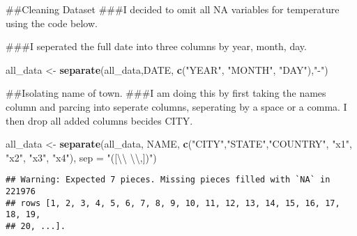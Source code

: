\documentclass[]{article}
\newenvironment{Shaded}{\begin{snugshade}}{\end{snugshade}}
\newcommand{\CharTok}[1]{\textcolor[rgb]{0.31,0.60,0.02}{#1}}
\newcommand{\CommentTok}[1]{\textcolor[rgb]{0.56,0.35,0.01}{\textit{#1}}}
\newcommand{\DataTypeTok}[1]{\textcolor[rgb]{0.13,0.29,0.53}{#1}}
\newcommand{\KeywordTok}[1]{\textcolor[rgb]{0.13,0.29,0.53}{\textbf{#1}}}
\newcommand{\NormalTok}[1]{#1}
\newcommand{\OperatorTok}[1]{\textcolor[rgb]{0.81,0.36,0.00}{\textbf{#1}}}
\newcommand{\StringTok}[1]{\textcolor[rgb]{0.31,0.60,0.02}{#1}}
\begin{document}
\#\#Cleaning Dataset \#\#\#I decided to omit all NA variables for
temperature using the code below.

\begin{Shaded}
\end{Shaded}

\#\#\#I seperated the full date into three columns by year, month, day.

\begin{Shaded}
\begin{Highlighting}[]
\NormalTok{all_data <-}\StringTok{ }\KeywordTok{separate}\NormalTok{(all_data,DATE, }\KeywordTok{c}\NormalTok{(}\StringTok{"YEAR"}\NormalTok{, }\StringTok{"MONTH"}\NormalTok{, }\StringTok{"DAY"}\NormalTok{),}\StringTok{"-"}\NormalTok{)}
\end{Highlighting}
\end{Shaded}

\#\#Isolating name of town. \#\#\#I am doing this by first taking the
names column and parcing into seperate columns, seperating by a space or
a comma. I then drop all added columns becides CITY.

\begin{Shaded}
\begin{Highlighting}[]
\NormalTok{all_data <-}\StringTok{ }\KeywordTok{separate}\NormalTok{(all_data, NAME, }\KeywordTok{c}\NormalTok{(}\StringTok{"CITY"}\NormalTok{,}\StringTok{"STATE"}\NormalTok{,}\StringTok{"COUNTRY"}\NormalTok{, }\StringTok{"x1"}\NormalTok{, }\StringTok{"x2"}\NormalTok{, }\StringTok{"x3"}\NormalTok{, }\StringTok{"x4"}\NormalTok{), }
    \DataTypeTok{sep =} \StringTok{"([}\CharTok{\textbackslash{}\textbackslash{}}\StringTok{ }\CharTok{\textbackslash{}\textbackslash{}}\StringTok{,])"}\NormalTok{)}
\end{Highlighting}
\end{Shaded}

\begin{verbatim}
## Warning: Expected 7 pieces. Missing pieces filled with `NA` in 221976
## rows [1, 2, 3, 4, 5, 6, 7, 8, 9, 10, 11, 12, 13, 14, 15, 16, 17, 18, 19,
## 20, ...].
\end{verbatim}

\begin{Shaded}
\end{Shaded}
\end{document}

